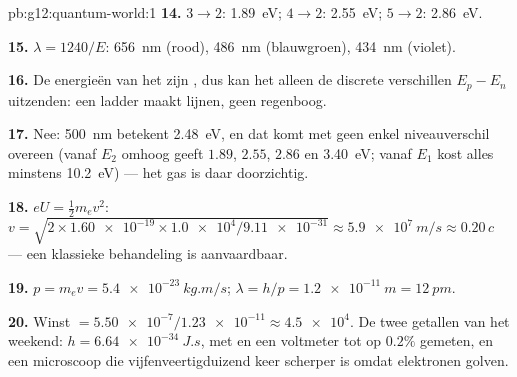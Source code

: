 \begin{solution}{pb:g12:quantum-world:1}
\textbf{14.} $3 \to 2$: \qty{1.89}{eV}; $4 \to 2$: \qty{2.55}{eV};
$5 \to 2$: \qty{2.86}{eV}.

\textbf{15.} $\lambda = 1240/E$: \qty{656}{nm} (rood), \qty{486}{nm}
(blauwgroen), \qty{434}{nm} (violet).

\textbf{16.} De energieën van het  zijn , dus kan het alleen
de discrete verschillen $E_p - E_n$ uitzenden: een ladder maakt lijnen, geen
regenboog.

\textbf{17.} Nee: \qty{500}{nm} betekent \qty{2.48}{eV}, en dat komt met geen
enkel niveauverschil overeen (vanaf $E_2$ omhoog geeft $1.89$, $2.55$, $2.86$
en \qty{3.40}{eV}; vanaf $E_1$ kost alles minstens \qty{10.2}{eV}) --- het gas
is daar doorzichtig.

\textbf{18.} $eU = \tfrac12 m_e v^2$: $v = \sqrt{2 \times
\num{1.60e-19} \times \num{1.0e4}/\num{9.11e-31}} \approx
\qty{5.9e7}{m/s} \approx 0.20\,c$ --- een klassieke behandeling is
aanvaardbaar.

\textbf{19.} $p = m_e v = \qty{5.4e-23}{kg.m/s}$;
$\lambda = h/p = \qty{1.2e-11}{m} = \qty{12}{pm}$.

\textbf{20.} Winst $= \num{5.50e-7}/\num{1.23e-11} \approx \num{4.5e4}$. De
twee getallen van het weekend: $h = \qty{6.64e-34}{J.s}$, met  en een
voltmeter tot op $0.2\%$ gemeten, en een microscoop die vijfenveertigduizend
keer scherper is omdat elektronen golven.
\end{solution}
